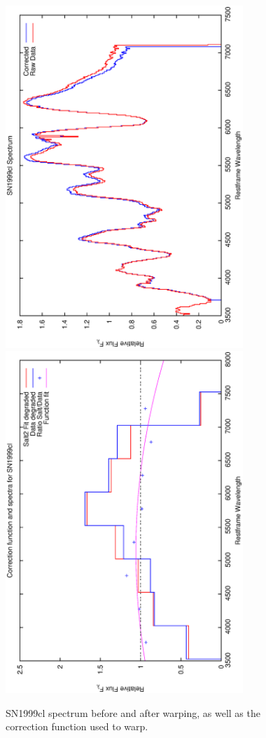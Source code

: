 \clearpage

\begin{figure}[p]
\centering
\includegraphics[angle=-90,width=0.8\textwidth]{./figures/spectrabeforeafter/SN1999cl_handpicked_v001_v024_before_after_spectra.ps}
\hfill
\includegraphics[angle=-90,width=0.8\textwidth]{./figures/corrections/SN1999cl_v001_correction.ps}
\hfill
\caption{SN1999cl spectrum before and after warping, as well as the correction function used to warp.}
\label{fig:SN1999clfour1}
\end{figure}

